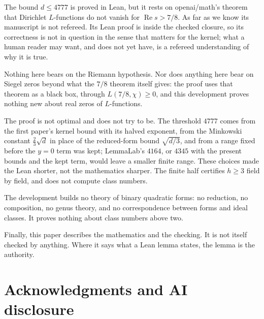 \documentclass[11pt]{article}
\theoremstyle{definition}
\newcommand{\re}{\operatorname{Re}}
\begin{document}
{The bound $d \le 4777$ is proved in Lean, but it rests on openai/math's theorem that Dirichlet $L$-functions do not vanish for $\re s > 7/8$. As far as we know its manuscript \cite{OAIqrh} is not refereed. Its Lean proof is inside the checked closure, so its correctness is not in question in the sense that matters for the kernel; what a human reader may want, and does not yet have, is a refereed understanding of why it is true.

Nothing here bears on the Riemann hypothesis. Nor does anything here bear on Siegel zeros beyond what the $7/8$ theorem itself gives: the proof uses that theorem as a black box, through $L(7/8,\chi) \ge 0$, and this development proves nothing new about real zeros of $L$-functions.

The proof is not optimal and does not try to be. The threshold $4777$ comes from the first paper's kernel bound with its halved exponent, from the Minkowski constant $\frac23\sqrt d$ in place of the reduced-form bound $\sqrt{d/3}$, and from a range fixed before the $y = 0$ term was kept; LemmaLab's $4164$, or $4345$ with the present bounds and the kept term, would leave a smaller finite range. These choices made the Lean shorter, not the mathematics sharper. The finite half certifies $h \ge 3$ field by field, and does not compute class numbers.

The development builds no theory of binary quadratic forms: no reduction, no composition, no genus theory, and no correspondence between forms and ideal classes. It proves nothing about class numbers above two.

Finally, this paper describes the mathematics and the checking. It is not itself checked by anything. Where it says what a Lean lemma states, the lemma is the authority.

\section*{Acknowledgments and AI disclosure}

}
\end{document}
